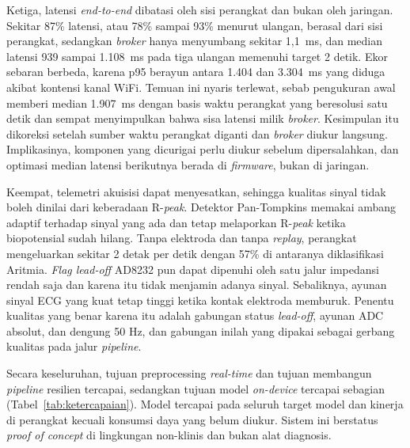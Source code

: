 Ketiga, latensi \textit{end-to-end} dibatasi oleh sisi perangkat dan bukan oleh jaringan. Sekitar 87\% latensi, atau 78\% sampai 93\% menurut ulangan, berasal dari sisi perangkat, sedangkan \textit{broker} hanya menyumbang sekitar 1,1~ms, dan median latensi 939 sampai 1.108~ms pada tiga ulangan memenuhi target 2 detik. Ekor sebaran berbeda, karena p95 berayun antara 1.404 dan 3.304~ms yang diduga akibat kontensi kanal WiFi. Temuan ini nyaris terlewat, sebab pengukuran awal memberi median 1.907~ms dengan basis waktu perangkat yang beresolusi satu detik dan sempat menyimpulkan bahwa sisa latensi milik \textit{broker}. Kesimpulan itu dikoreksi setelah sumber waktu perangkat diganti dan \textit{broker} diukur langsung. Implikasinya, komponen yang dicurigai perlu diukur sebelum dipersalahkan, dan optimasi median latensi berikutnya berada di \textit{firmware}, bukan di jaringan.

Keempat, telemetri akuisisi dapat menyesatkan, sehingga kualitas sinyal tidak boleh dinilai dari keberadaan R-\textit{peak}. Detektor Pan-Tompkins memakai ambang adaptif terhadap sinyal yang ada dan tetap melaporkan R-\textit{peak} ketika biopotensial sudah hilang. Tanpa elektroda dan tanpa \textit{replay}, perangkat mengeluarkan sekitar 2 detak per detik dengan 57\% di antaranya diklasifikasi Aritmia. \textit{Flag lead-off} AD8232 pun dapat dipenuhi oleh satu jalur impedansi rendah saja dan karena itu tidak menjamin adanya sinyal. Sebaliknya, ayunan sinyal ECG yang kuat tetap tinggi ketika kontak elektroda memburuk. Penentu kualitas yang benar karena itu adalah gabungan status \textit{lead-off}, ayunan ADC absolut, dan dengung 50 Hz, dan gabungan inilah yang dipakai sebagai gerbang kualitas pada jalur \textit{pipeline}.

Secara keseluruhan, tujuan preprocessing \textit{real-time} dan tujuan membangun \textit{pipeline} resilien tercapai, sedangkan tujuan model \textit{on-device} tercapai sebagian (Tabel~\ref{tab:ketercapaian}). Model tercapai pada seluruh target model dan kinerja di perangkat kecuali konsumsi daya yang belum diukur. Sistem ini berstatus \textit{proof of concept} di lingkungan non-klinis dan bukan alat diagnosis.

